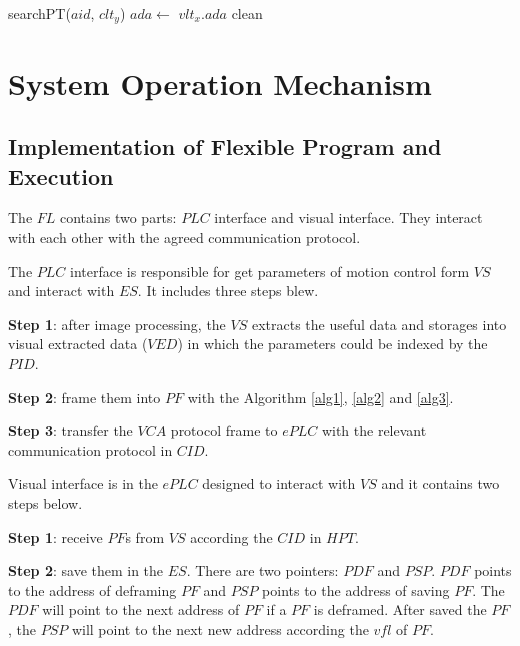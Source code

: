 \documentclass[journal,UTF8]{IEEEtran}
\begin{document}
\begin{algorithm}
	\label{alg6}
	\caption{$ALDeframing$}%
	searchPT($aid$, $clt_y$)\;
	$ada\leftarrow$ $vlt_x.ada$\;
	clean\;
\end{algorithm}


\section{System Operation Mechanism}
\label{Execution}
\subsection{Implementation of Flexible Program and Execution}
The $FL$ contains two parts: $PLC$ interface and visual interface. They interact with each other with the agreed communication protocol.

The $PLC$ interface is responsible for get parameters of motion control form $VS$ and interact with $ES$. It includes three steps blew.

\textbf{Step 1}: after image processing, the $VS$ extracts the useful data and storages into visual extracted data ($VED$) in which the parameters could be indexed by the $PID$.

\textbf{Step 2}: frame them into $PF$ with the Algorithm \ref{alg1}, \ref{alg2} and \ref{alg3}.

\textbf{Step 3}: transfer the $VCA$ protocol frame to $ePLC$ with the relevant communication protocol in $CID$.

Visual interface is in the $ePLC$ designed to interact with $VS$ and it contains two steps below. 

\textbf{Step 1}: receive $PF$s from $VS$ according the $CID$ in $HPT$.

\textbf{Step 2}: save them in the $ES$. There are two pointers: $PDF$ and $PSP$. $PDF$ points to the address of deframing $PF$ and $PSP$ points to the address of saving $PF$. The $PDF$ will point to the next address of $PF$ if a $PF$ is deframed. After saved the $PF$, the $PSP$ will point to the next new address according the $vfl$ of $PF$. 





\end{document}
